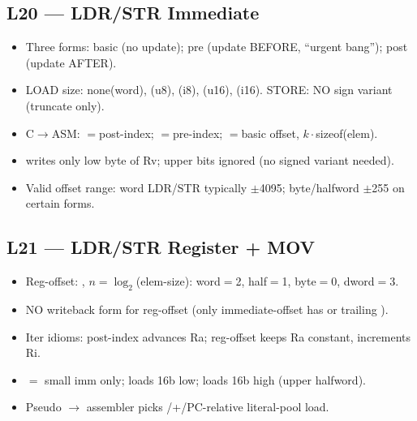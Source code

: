 \subsection{L20 --- LDR/STR Immediate}
\begin{itemize}
\item Three forms: \asm{[Ra,\#os]} basic (no update); \asm{[Ra,\#os]!} pre (update BEFORE, ``urgent bang'');  post (update AFTER).
\item LOAD size: none(word), (u8), (i8), (u16), (i16). STORE: NO sign variant (truncate only).
\item C$\to$ASM: $=$post-index; $=$pre-index; $=$basic offset, $k\cdot$sizeof(elem).
\item {} writes only low byte of Rv; upper bits ignored (no signed variant needed).
\item Valid offset range: word LDR/STR typically $\pm$4095; byte/halfword $\pm$255 on certain forms.
\end{itemize}

\subsection{L21 --- LDR/STR Register + MOV}
\begin{itemize}
\item Reg-offset: , $n=\log_2$(elem-size): word$=$2, half$=$1, byte$=$0, dword$=$3.
\item NO writeback form for reg-offset (only immediate-offset has \asm{!} or trailing ).
\item Iter idioms: post-index advances Ra; reg-offset keeps Ra constant, increments Ri.
\item {} $=$ small imm only;  loads 16b low;  loads 16b high (upper halfword).
\item Pseudo  $\to$ assembler picks /+/PC-relative literal-pool load.
\end{itemize}

